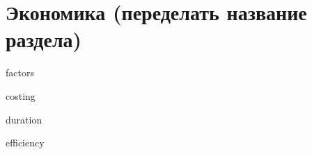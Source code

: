 \section{Экономика (переделать название раздела)}

{factors}

{costing}

{duration}

{efficiency}

\newpage
